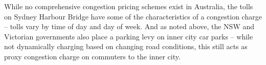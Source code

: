 \documentclass{article}
\begin{document}
While no comprehensive congestion pricing schemes exist in Australia, the tolls on Sydney Harbour Bridge have some of the characteristics of a congestion charge -- tolls vary by time of day and day of week. And as noted above, the NSW and Victorian governments also place a parking levy on inner city car parks -- while not dynamically charging based on changing road conditions, this still acts as proxy congestion charge on commuters to the inner city.
\end{document}
